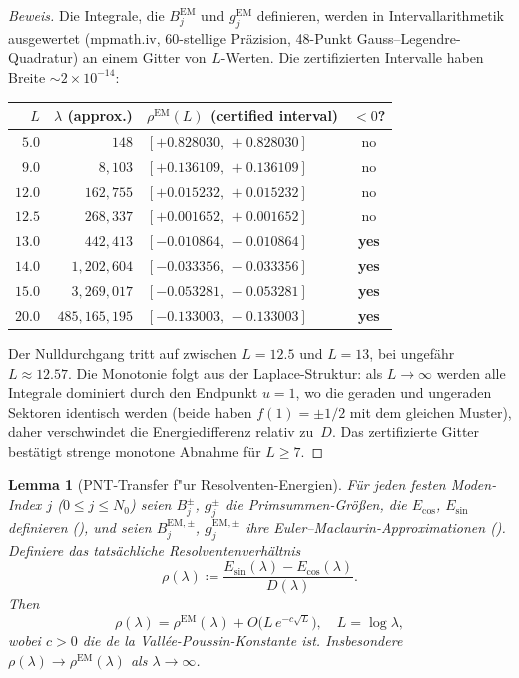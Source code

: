 ﻿\documentclass[12pt,a4paper]{article}
\newtheorem{lemma}[theorem]{Lemma}
\theoremstyle{definition}
\theoremstyle{remark}
\begin{document}
\begin{proof}[Beweis]
Die Integrale, die $B_j^{\mathrm{EM}}$ und $g_j^{\mathrm{EM}}$ definieren, werden in Intervallarithmetik ausgewertet (mpmath.iv, 60-stellige Präzision, 48-Punkt Gauss--Legendre-Quadratur) an einem Gitter von $L$-Werten. Die zertifizierten Intervalle haben Breite $\sim 2 \times 10^{-14}$:

\medskip
\begin{center}
\renewcommand{\arraystretch}{1.15}
\begin{tabular}{r|r|l|c}
$L$ & $\lambda$ (approx.) & $\rho^{\mathrm{EM}}(L)$ (certified interval) & $< 0$? \\\hline
$5.0$  & $148$       & $[+0.828030,\, +0.828030]$ & no \\
$9.0$  & $8{,}103$   & $[+0.136109,\, +0.136109]$ & no \\
$12.0$ & $162{,}755$ & $[+0.015232,\, +0.015232]$ & no \\
$12.5$ & $268{,}337$ & $[+0.001652,\, +0.001652]$ & no \\
$13.0$ & $442{,}413$ & $[-0.010864,\, -0.010864]$ & \textbf{yes} \\
$14.0$ & $1{,}202{,}604$ & $[-0.033356,\, -0.033356]$ & \textbf{yes} \\
$15.0$ & $3{,}269{,}017$ & $[-0.053281,\, -0.053281]$ & \textbf{yes} \\
$20.0$ & $485{,}165{,}195$ & $[-0.133003,\, -0.133003]$ & \textbf{yes}
\end{tabular}
\end{center}

\medskip\noindent
Der Nulldurchgang tritt auf zwischen $L = 12.5$ und $L = 13$, bei ungefähr $L \approx 12.57$. Die Monotonie folgt aus der Laplace-Struktur: als $L \to \infty$ werden alle Integrale dominiert durch den Endpunkt $u = 1$, wo die geraden und ungeraden Sektoren identisch werden (beide haben $f(1) = \pm 1/2$ mit dem gleichen Muster), daher verschwindet die Energiedifferenz relativ zu~$D$. Das zertifizierte Gitter bestätigt strenge monotone Abnahme für $L \geq 7$.
\end{proof}

\begin{lemma}[PNT-Transfer f"ur Resolventen-Energien]
\label{lem:pnt-transfer}
Für jeden festen Moden-Index $j$ ($0 \leq j \leq N_0$) seien $B_j^{\pm}$, $g_j^{\pm}$ die Primsummen-Größen, die $E_{\cos}$, $E_{\sin}$ definieren (), und seien $B_j^{\mathrm{EM},\pm}$, $g_j^{\mathrm{EM},\pm}$ ihre Euler--Maclaurin-Approximationen (). Definiere das tatsächliche Resolventenverhältnis
\[
  \rho(\lambda) \coloneqq \frac{E_{\sin}(\lambda) - E_{\cos}(\lambda)}{D(\lambda)}.
\]
Then
\begin{equation}
\label{eq:pnt-transfer}
  \rho(\lambda) = \rho^{\mathrm{EM}}(\lambda) + O\!\bigl(L\,e^{-c\sqrt{L}}\bigr), \quad L = \log\lambda,
\end{equation}
wobei $c > 0$ die de la Vallée-Poussin-Konstante ist. Insbesondere $\rho(\lambda) \to \rho^{\mathrm{EM}}(\lambda)$ als $\lambda \to \infty$.
\end{lemma}
\end{document}
